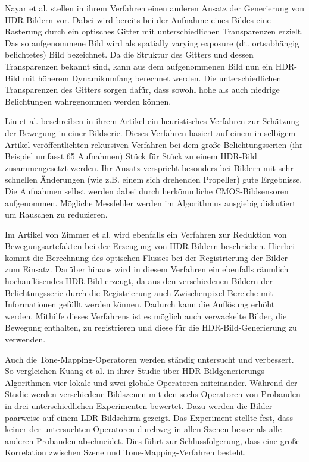 Nayar et al. \cite{Nayar00highdynamic} stellen in ihrem Verfahren einen anderen Ansatz der Generierung von \gls{HDR}-Bildern vor. Dabei wird bereits bei der Aufnahme eines Bildes eine Rasterung durch ein optisches Gitter mit unterschiedlichen Transparenzen erzielt. Das so aufgenommene Bild wird als spatially varying exposure (dt. ortsabhängig belichtetes) Bild bezeichnet. Da die Struktur des Gitters und dessen Transparenzen bekannt sind, kann aus dem aufgenommenen Bild nun ein \gls{HDR}-Bild mit höherem Dynamikumfang berechnet werden. Die unterschiedlichen Transparenzen des Gitters sorgen dafür, dass sowohl hohe als auch niedrige Belichtungen wahrgenommen werden können. 

Liu et al. \cite{Xinqiao} beschreiben in ihrem Artikel ein heuristisches Verfahren zur Schätzung der Bewegung in einer Bildserie. Dieses Verfahren basiert auf einem in selbigem Artikel veröffentlichten rekursiven Verfahren bei dem große Belichtungsserien (ihr Beispiel umfasst 65 Aufnahmen) Stück für Stück zu einem \gls{HDR}-Bild zusammengesetzt werden. Ihr Ansatz verspricht besonders bei Bildern mit sehr schnellen Änderungen (wie z.B. einem sich drehenden Propeller) gute Ergebnisse. Die Aufnahmen selbst werden dabei durch herkömmliche \gls{CMOS}-Bildsensoren aufgenommen. Mögliche Messfehler werden im Algorithmus ausgiebig diskutiert um Rauschen zu reduzieren.

Im Artikel von Zimmer et al. \cite{zimmer} wird ebenfalls ein Verfahren zur Reduktion von Bewegungsartefakten bei der Erzeugung von \gls{HDR}-Bildern beschrieben. Hierbei kommt die Berechnung des optischen Flusses bei der Registrierung der Bilder zum Einsatz. Darüber hinaus wird in diesem Verfahren ein ebenfalls räumlich hochauflösendes \gls{HDR}-Bild erzeugt, da aus den verschiedenen Bildern der Belichtungsserie durch die Registrierung auch Zwischenpixel-Bereiche mit Informationen gefüllt werden können. Dadurch kann die Auflösung erhöht werden. Mithilfe dieses Verfahrens ist es möglich auch verwackelte Bilder, die Bewegung enthalten, zu registrieren und diese für die \gls{HDR}-Bild-Generierung zu verwenden.

Auch die \gls{Tone-Mapping}-Operatoren werden ständig untersucht und verbessert. So vergleichen Kuang et al. \cite{tone_mapper_2} in ihrer Studie über \gls{HDR}-Bildgenerierungs-Algorithmen vier lokale und zwei globale Operatoren miteinander. Während der Studie werden verschiedene Bildszenen mit den sechs Operatoren von Probanden in drei unterschiedlichen Experimenten bewertet. Dazu werden die Bilder paarweise auf einem \gls{LDR}-Bildschirm gezeigt. Das Experiment stellte fest, dass keiner der untersuchten Operatoren durchweg in allen Szenen besser als alle anderen Probanden abschneidet. Dies führt zur Schlussfolgerung, dass eine große Korrelation zwischen Szene und \gls{Tone-Mapping}-Verfahren besteht. 

